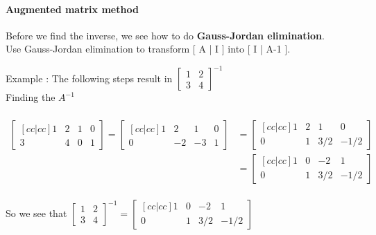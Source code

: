 \paragraph{Augmented matrix method}

Before we find the inverse, we see how to do \textbf{Gauss-Jordan elimination}. \\
Use Gauss-Jordan elimination to transform [ A | I ] into [ I | A-1 ].

Example :  The following steps result in 
$
\begin{bmatrix}
1 & 2 \\
3 & 4 
\end{bmatrix} ^ {-1}
$ \\

Finding the $A^{-1}$ \\ \\
\begin{align*}   
\begin{bmatrix} [cc|cc]
1 & 2 & 1 & 0 \\
3 & 4 & 0 & 1 
\end{bmatrix} 
=
\begin{bmatrix} [cc|cc]
1 & 2 & 1 & 0 \\
0 & -2 & -3 & 1 
\end{bmatrix}  
&=
\begin{bmatrix} [cc|cc]
1 & 2 & 1 & 0 \\
0 & 1 & 3/2 & -1/2 
\end{bmatrix} \\
&=
\begin{bmatrix} [cc|cc]
1 & 0 & -2 & 1 \\
0 & 1 & 3/2 & -1/2 
\end{bmatrix} \\
\end{align*}  

So we see that
$
\begin{bmatrix}
1 & 2 \\
3 & 4 
\end{bmatrix} ^ {-1} 
=
\begin{bmatrix} [cc|cc]
1 & 0 & -2 & 1 \\
0 & 1 & 3/2 & -1/2 
\end{bmatrix}
$ 
\\

